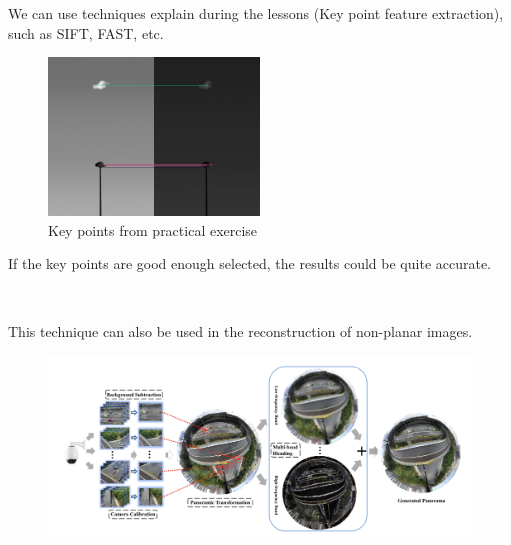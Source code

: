 \begin{frame}{\secname}
    We can use techniques explain during the lessons (Key point feature extraction), such as SIFT, FAST, etc.
    \begin{figure}
        \includegraphics[width=0.5\textwidth]{../doc/sift_algorithm/img/final.png}
        \caption{Key points from practical exercise}
    \end{figure}
\end{frame}

\begin{frame}{\secname}
    If the key points are good enough selected, the results could be quite accurate.
    \begin{figure}
        \centering
         \\
    \end{figure}
\end{frame}

\begin{frame}{\secname}
    This technique can also be used in the reconstruction of non-planar images. \cite{yong_panoramic_2019}
    \begin{figure}
        \centering
        \includegraphics[width=\textwidth]{img/pano_esphere}
    \end{figure}
\end{frame}

